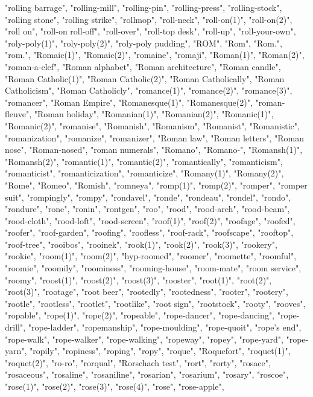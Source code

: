 "rolling barrage",
"rolling-mill",
"rolling-pin",
"rolling-press",
"rolling-stock",
"rolling stone",
"rolling strike",
"rollmop",
"roll-neck",
"roll-on(1)",
"roll-on(2)",
"roll on",
"roll-on roll-off",
"roll-over",
"roll-top desk",
"roll-up",
"roll-your-own",
"roly-poly(1)",
"roly-poly(2)",
"roly-poly pudding",
"ROM",
"Rom",
"Rom.",
"rom.",
"Romaic(1)",
"Romaic(2)",
"romaine",
"romaji",
"Roman(1)",
"Roman(2)",
"roman-a-clef",
"Roman alphabet",
"Roman architecture",
"Roman candle",
"Roman Catholic(1)",
"Roman Catholic(2)",
"Roman Catholically",
"Roman Catholicism",
"Roman Catholicly",
"romance(1)",
"romance(2)",
"romance(3)",
"romancer",
"Roman Empire",
"Romanesque(1)",
"Romanesque(2)",
"roman-fleuve",
"Roman holiday",
"Romanian(1)",
"Romanian(2)",
"Romanic(1)",
"Romanic(2)",
"romanise",
"Romanish",
"Romanism",
"Romanist",
"Romanistic",
"romanization",
"romanize",
"romanizer",
"Roman law",
"Roman letters",
"Roman nose",
"Roman-nosed",
"roman numerals",
"Romano",
"Romano-",
"Romansh(1)",
"Romansh(2)",
"romantic(1)",
"romantic(2)",
"romantically",
"romanticism",
"romanticist",
"romanticization",
"romanticize",
"Romany(1)",
"Romany(2)",
"Rome",
"Romeo",
"Romish",
"romneya",
"romp(1)",
"romp(2)",
"romper",
"romper suit",
"rompingly",
"rompy",
"rondavel",
"ronde",
"rondeau",
"rondel",
"rondo",
"rondure",
"rone",
"ronin",
"rontgen",
"roo",
"rood",
"rood-arch",
"rood-beam",
"rood-cloth",
"rood-loft",
"rood-screen",
"roof(1)",
"roof(2)",
"roofage",
"roofed",
"roofer",
"roof-garden",
"roofing",
"roofless",
"roof-rack",
"roofscape",
"rooftop",
"roof-tree",
"rooibos",
"rooinek",
"rook(1)",
"rook(2)",
"rook(3)",
"rookery",
"rookie",
"room(1)",
"room(2)",
"hyp-roomed",
"roomer",
"roomette",
"roomful",
"roomie",
"roomily",
"roominess",
"rooming-house",
"room-mate",
"room service",
"roomy",
"roost(1)",
"roost(2)",
"roost(3)",
"rooster",
"root(1)",
"root(2)",
"root(3)",
"rootage",
"root beer",
"rootedly",
"rootedness",
"rooter",
"rootery",
"rootle",
"rootless",
"rootlet",
"rootlike",
"root sign",
"rootstock",
"rooty",
"rooves",
"ropable",
"rope(1)",
"rope(2)",
"ropeable",
"rope-dancer",
"rope-dancing",
"rope-drill",
"rope-ladder",
"ropemanship",
"rope-moulding",
"rope-quoit",
"rope's end",
"rope-walk",
"rope-walker",
"rope-walking",
"ropeway",
"ropey",
"rope-yard",
"rope-yarn",
"ropily",
"ropiness",
"roping",
"ropy",
"roque",
"Roquefort",
"roquet(1)",
"roquet(2)",
"ro-ro",
"rorqual",
"Rorschach test",
"rort",
"rorty",
"rosace",
"rosaceous",
"rosaline",
"rosaniline",
"rosarian",
"rosarium",
"rosary",
"roscoe",
"rose(1)",
"rose(2)",
"rose(3)",
"rose(4)",
"rose",
"rose-apple",
